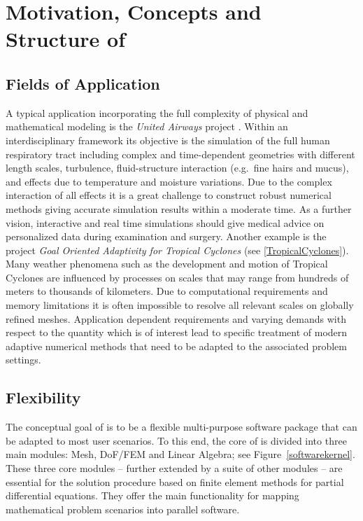 \section{Motivation, Concepts and Structure of \hiflow{}}

\subsection{Fields of Application}
A typical application incorporating the full complexity of physical
and mathematical modeling is the \emph{United Airways} project
\cite{ua:10}.  Within an interdisciplinary framework its objective is
the simulation of the full human respiratory tract including complex
and time-dependent geometries with different length scales,
turbulence, fluid-structure interaction (e.g.~fine hairs and mucus),
and effects due to temperature and moisture variations. Due to the
complex interaction of all effects it is a great challenge to
construct robust numerical methods giving accurate simulation results
within a moderate time. As a further vision, interactive and real time
simulations should give medical advice on personalized data during
examination and surgery. Another example is the project 
\emph{Goal Oriented Adaptivity for Tropical Cyclones} (see \ref{TropicalCyclones}).
Many weather phenomena such as the development and motion of Tropical
Cyclones are influenced by processes on scales that may range from hundreds 
of meters to thousands of kilometers. Due to computational requirements and memory 
limitations it is often impossible to resolve all relevant scales on globally 
refined meshes. 
Application dependent requirements and varying demands with respect to the quantity 
which is of interest lead to specific treatment of modern adaptive numerical 
methods that need to be adapted to the associated problem settings.

\subsection{Flexibility}
The conceptual goal of \hiflow{} is to be a flexible multi-purpose
software package that can be adapted to most user scenarios. To this
end, the core of \hiflow{} is divided into three main modules: Mesh,
DoF/FEM and Linear Algebra; see
Figure~\ref{softwarekernel}. These three core modules -- further extended
by a suite of other modules -- are essential for the solution
procedure based on finite element methods for partial
differential equations. They offer the main functionality for mapping
mathematical problem scenarios into parallel software.

